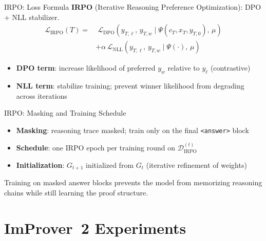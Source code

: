 \documentclass{beamer}
\begin{document}
\begin{frame}{IRPO: Loss Formula}
\vspace{0.5em}
\textbf{IRPO} (Iterative Reasoning Preference Optimization): DPO + NLL stabilizer.
\vspace{0.6em}
\begin{align*}
  \mathcal{L}_{\mathrm{IRPO}}(T) = &\;\mathcal{L}_{\mathrm{DPO}}(y_{T,\ell},\, y_{T,w} \mid \Psi(c_T,x_T,y_{T,0}),\, \mu)\\
    &+ \alpha\,\mathcal{L}_{\mathrm{NLL}}(y_{T,\ell},\, y_{T,w} \mid \Psi(\cdot),\, \mu)
\end{align*}
\vspace{0.6em}
\begin{itemize}\setlength{\itemsep}{10pt}
  \item \textbf{DPO term}: increase likelihood of preferred $y_w$ relative to $y_\ell$ (contrastive)
  \item \textbf{NLL term}: stabilize training; prevent winner likelihood from degrading across iterations
\end{itemize}
\end{frame}

\begin{frame}{IRPO: Masking and Training Schedule}
\vspace{0.8em}
\begin{itemize}\setlength{\itemsep}{14pt}
  \item \textbf{Masking}: reasoning trace masked; train only on the final \texttt{<answer>} block
  \item \textbf{Schedule}: one IRPO epoch per training round on $\mathcal{D}_{\mathrm{IRPO}}^{(t)}$
  \item \textbf{Initialization}: $G_{t+1}$ initialized from $G_t$ (iterative refinement of weights)
\end{itemize}
\vspace{0.8em}
\begin{exampleblock}{}
  Training on masked answer blocks prevents the model from memorizing reasoning chains while still learning the proof structure.
\end{exampleblock}
\end{frame}

\section{ImProver~2 Experiments}
\end{document}
